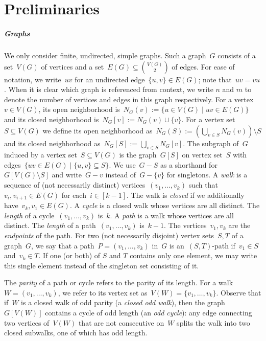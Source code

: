 \section{Preliminaries} \label{sec:prelims}

\subparagraph*{Graphs} We only consider finite, undirected, simple graphs. Such a graph~$G$ consists of a set~$V(G)$ of vertices and a set~$E(G) \subseteq \binom{V(G)}{2}$ of edges. For ease of notation, we write~$uv$ for an undirected edge~$\{u,v\} \in E(G)$; note that~$uv = vu$. When it is clear which graph is referenced from context, we write $n$ and $m$ to denote the number of vertices and edges in this graph respectively. For a vertex~$v \in V(G)$, its open neighborhood is~$N_G(v) := \{u \in V(G) \mid uv \in E(G)\}$ and its closed neighborhood is~$N_G[v] := N_G(v) \cup \{v\}$. For a vertex set~$S \subseteq V(G)$ we define its open neighborhood as~$N_G(S) := (\bigcup _{v \in S} N_G(v)) \setminus S$ and its closed neighborhood as~$N_G[S] := \bigcup_{v \in S} N_G[v]$. The subgraph of~$G$ induced by a vertex set~$S \subseteq V(G)$ is the graph~$G[S]$ on vertex set~$S$ with edges~$\{uv \in E(G) \mid \{u,v\} \subseteq S\}$. We use~$G-S$ as a shorthand for~$G[V(G) \setminus S]$ and write~$G - v$ instead of~$G - \{v\}$ for singletons. A \emph{walk} is a sequence of (not necessarily distinct) vertices~$(v_1, \ldots, v_k)$ such that~$v_i, v_{i+1} \in E(G)$ for each~$i \in [k-1]$. The walk is \emph{closed} if we additionally have~$v_k, v_1 \in E(G)$. A \emph{cycle} is a closed walk whose vertices are all distinct. The \emph{length} of a cycle~$(v_1, \ldots, v_k)$ is~$k$. A \emph{path} is a walk whose vertices are all distinct. The \emph{length} of a path~$(v_1, \ldots, v_k)$ is~$k-1$. The vertices~$v_1, v_k$ are the \emph{endpoints} of the path. For two (not necessarily disjoint) vertex sets~$S,T$ of a graph~$G$, we say that a path~$P = (v_1, \ldots, v_k)$ in~$G$ is an~$(S,T)$-path if~$v_1 \in S$ and~$v_k \in T$. If one (or both) of $S$ and $T$ contains only one element, we may write this single element instead of the singleton set consisting of it. 

The \emph{parity} of a path or cycle refers to the parity of its length. For a walk~$W = (v_1, \ldots, v_k)$, we refer to its vertex set as~$V(W) = \{v_1, \ldots, v_k\}$. Observe that if~$W$ is a closed walk of odd parity (a \emph{closed odd walk}), then the graph~$G[V(W)]$ contains a cycle of odd length (an \emph{odd cycle}): any edge connecting two vertices of~$V(W)$ that are not consecutive on~$W$ splits the walk into two closed subwalks, one of which has odd length.

